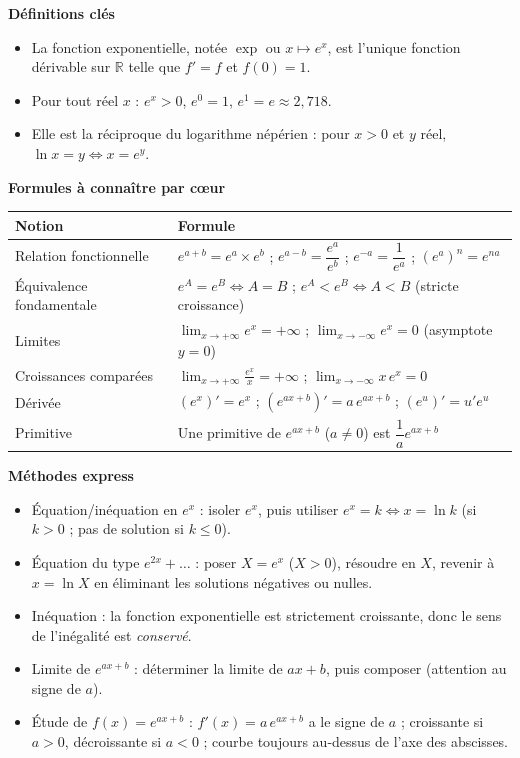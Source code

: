 \documentclass[11pt]{article}
\newcommand{\cle}[1]{{\popxbold\color{popdark}#1}}
\begin{document}
\begin{aretenir}
\textbf{Définitions clés}
\begin{itemize}
\item La \cle{fonction exponentielle}, notée $\exp$ ou $x\mapsto e^x$, est l'unique fonction dérivable sur $\mathbb{R}$ telle que $f'=f$ et $f(0)=1$.
\item Pour tout réel $x$ : $e^x>0$, $e^0=1$, $e^1=e\approx 2{,}718$.
\item Elle est la \cle{réciproque} du logarithme népérien : pour $x>0$ et $y$ réel, $\ln x = y \iff x = e^y$.
\end{itemize}

\textbf{Formules à connaître par cœur}
\begin{center}
\begin{tabularx}{\linewidth}{|l|X|}
\hline
\rowcolor{popblueL} \textbf{Notion} & \textbf{Formule} \\
\hline
Relation fonctionnelle & $e^{a+b}=e^a\times e^b$ ; \quad $e^{a-b}=\dfrac{e^a}{e^b}$ ; \quad $e^{-a}=\dfrac{1}{e^a}$ ; \quad $(e^a)^n=e^{na}$ \\
\hline
Équivalence fondamentale & $e^A=e^B \iff A=B$ ; \quad $e^A<e^B \iff A<B$ (stricte croissance) \\
\hline
Limites & $\displaystyle\lim_{x\to+\infty}e^x=+\infty$ ; \quad $\displaystyle\lim_{x\to-\infty}e^x=0$ (asymptote $y=0$) \\
\hline
Croissances comparées & $\displaystyle\lim_{x\to+\infty}\frac{e^x}{x}=+\infty$ ; \quad $\displaystyle\lim_{x\to-\infty}x\,e^x=0$ \\
\hline
Dérivée & $(e^x)'=e^x$ ; \quad $(e^{ax+b})'=a\,e^{ax+b}$ ; \quad $(e^u)'=u'e^u$ \\
\hline
Primitive & Une primitive de $e^{ax+b}$ ($a\neq 0$) est $\dfrac{1}{a}e^{ax+b}$ \\
\hline
\end{tabularx}
\end{center}

\textbf{Méthodes express}
\begin{itemize}
\item \cle{Équation/inéquation en $e^x$} : isoler $e^x$, puis utiliser $e^x=k \iff x=\ln k$ (si $k>0$ ; pas de solution si $k\leq 0$).
\item \cle{Équation du type $e^{2x}+\dots$} : poser $X=e^x$ ($X>0$), résoudre en $X$, revenir à $x=\ln X$ en éliminant les solutions négatives ou nulles.
\item \cle{Inéquation} : la fonction exponentielle est strictement croissante, donc le sens de l'inégalité est \emph{conservé}.
\item \cle{Limite de $e^{ax+b}$} : déterminer la limite de $ax+b$, puis composer (attention au signe de $a$).
\item \cle{Étude de $f(x)=e^{ax+b}$} : $f'(x)=a\,e^{ax+b}$ a le signe de $a$ ; croissante si $a>0$, décroissante si $a<0$ ; courbe toujours au-dessus de l'axe des abscisses.
\end{itemize}
\end{aretenir}
\end{document}

